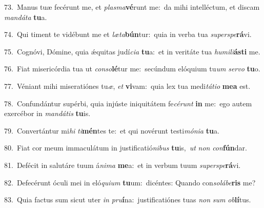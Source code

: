 {\numbfont\textcolor{\numbcolor}{73.}}~Manus tuæ fecérunt me, et \textit{plas}\-\textit{ma}\textbf{vé}runt me:~\star da mihi intelléctum, et discam \textit{man}\-\textit{dá}\textit{ta} \textbf{tu}\-a.\par
{\numbfont\textcolor{\numbcolor}{74.}}~Qui timent te vidébunt me et \textit{læ}\-\textit{ta}\textbf{bún}tur:~\star quia in verba tua \textit{su}\-\textit{per}\textit{spe}\textbf{rá}vi.\par
{\numbfont\textcolor{\numbcolor}{75.}}~Cognóvi, Dómine, quia ǽquitas judí\-\textit{ci}\-\textit{a} \textbf{tu}\-a:~\star et in veritáte tua \textit{hu}\-\textit{mi}\textit{li}\textbf{ás}\textbf{ti} me.\par
{\numbfont\textcolor{\numbcolor}{76.}}~Fiat misericórdia tua ut \textit{con}\-\textit{so}\textbf{lé}tur me:~\star secúndum elóquium tu\textit{um} \textit{ser}\-\textit{vo} \textbf{tu}\-o.\par
{\numbfont\textcolor{\numbcolor}{77.}}~Véniant mihi miseratiónes tu\-\textit{æ}\-, \textit{et} \textbf{vi}\-vam:~\star quia lex tua medi\-\textit{tá}\-\textit{ti}\textit{o} \textbf{me}\-\textbf{a} est.\par
{\numbfont\textcolor{\numbcolor}{78.}}~Confundántur supérbi, quia injúste iniquitátem fe\-\textit{cé}\-\textit{runt} \textbf{in} me:~\star ego autem exercébor in \textit{man}\-\textit{dá}\textit{tis} \textbf{tu}\-is.\par
{\numbfont\textcolor{\numbcolor}{79.}}~Convertántur mi\textit{hi} \textit{ti}\-\textbf{mén}tes te:~\star et qui novérunt testi\-\textit{mó}\-\textit{ni}\textit{a} \textbf{tu}\-a.\par
{\numbfont\textcolor{\numbcolor}{80.}}~Fiat cor meum immaculátum in justificatió\-\textit{ni}\-\textit{bus} \textbf{tu}\-is,~\star \textit{ut} \textit{non} \textit{con}\-\textbf{fún}dar.\par
{\numbfont\textcolor{\numbcolor}{81.}}~Defécit in salutáre tuum á\-\textit{ni}\-\textit{ma} \textbf{me}\-a:~\star et in verbum tuum \textit{su}\-\textit{per}\textit{spe}\textbf{rá}vi.\par
{\numbfont\textcolor{\numbcolor}{82.}}~Defecérunt óculi mei in eló\-\textit{qui}\-\textit{um} \textbf{tu}\-um:~\star dicéntes: Quando con\-\textit{so}\-\textit{lá}\textit{be}\textbf{ris} me?\par
{\numbfont\textcolor{\numbcolor}{83.}}~Quia factus sum sicut uter \textit{in} \textit{pru}\-\textbf{í}na:~\star justificatiónes tuas \textit{non} \textit{sum} \textit{ob}\-\textbf{lí}tus.\par
